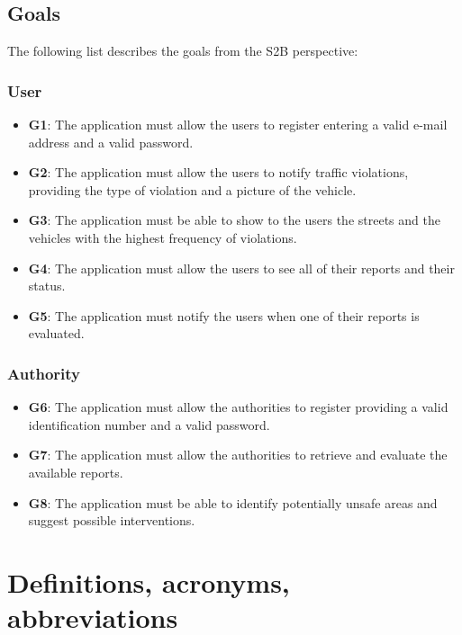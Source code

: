 \documentclass[12pt,a4paper]{report}
\begin{document}
	\subsection{Goals}
	The following list describes the goals from the S2B perspective:
		\subsubsection{User}
	\begin{itemize}
		\item \textbf{G1}: The application must allow the users to register entering a valid e-mail address and a valid password.
		\item \textbf{G2}: The application must allow the users to notify traffic violations, providing  the type of violation and a picture of the vehicle.
		\item \textbf{G3}: The application must be able to show to the users the streets and the vehicles with the highest frequency of violations.
		\item \textbf{G4}: The application must allow the users to see all of their reports and their status.
		\item \textbf{G5}: The application must notify the users when one of their reports is evaluated.
	\end{itemize}
		\subsubsection{Authority}
	\begin{itemize}
		\item \textbf{G6}: The application must allow the authorities to register providing a valid identification number and a valid password.
	  	\item \textbf{G7}: The application must allow the authorities to retrieve and evaluate the available reports.
		\item \textbf{G8}: The application must be able to identify potentially unsafe areas and suggest possible interventions.
	\end{itemize}
	

	\section{Definitions, acronyms, abbreviations}
\end{document}
